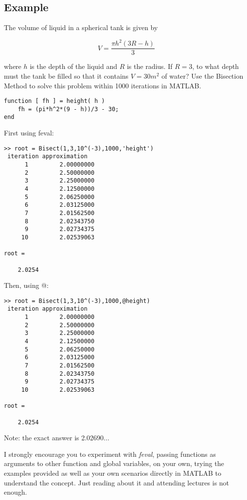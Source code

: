 \documentclass [titlepage,12pt,letter] {article}
\begin{document}
\subsection{Example}
The volume of liquid in a spherical tank is given by

\[
V = \frac{\pi h^2 (3R - h)}{3}
\]

\noindent
where $h$ is the depth of the liquid and $R$ is the radius. If $R=3$, to what depth must the tank be filled so that it contains $V=30m^2$ of water? Use the Bisection Method to solve this problem within 1000 iterations in MATLAB.

\begin{verbatim} 
function [ fh ] = height( h )
    fh = (pi*h^2*(9 - h))/3 - 30;
end
\end{verbatim}

First using feval:

\begin{verbatim} 
>> root = Bisect(1,3,10^(-3),1000,'height')
 iteration approximation 
      1         2.00000000 
      2         2.50000000 
      3         2.25000000 
      4         2.12500000 
      5         2.06250000 
      6         2.03125000 
      7         2.01562500 
      8         2.02343750 
      9         2.02734375 
     10         2.02539063 

root =

    2.0254
\end{verbatim}

Then, using @:

\begin{verbatim} 
>> root = Bisect(1,3,10^(-3),1000,@height)
 iteration approximation 
      1         2.00000000 
      2         2.50000000 
      3         2.25000000 
      4         2.12500000 
      5         2.06250000 
      6         2.03125000 
      7         2.01562500 
      8         2.02343750 
      9         2.02734375 
     10         2.02539063 

root =

    2.0254
\end{verbatim}

\noindent
Note: the exact answer is 2.02690...


I strongly encourage you to experiment with {\it feval}, passing functions as
arguments to other function and global variables,
on your own, trying the examples provided as well as your own
scenarios directly in MATLAB to understand the concept. Just reading
about it and attending lectures is not enough. 
\end{document}
